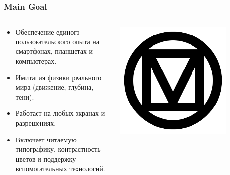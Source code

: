 \documentclass[12pt]{beamer}
\begin{document}
	\begin{frame}
		\frametitle{Main Goal}
        \begin{columns}
            \begin{column}{0.5\textwidth}
                \begin{itemize}
                    \item Обеспечение единого пользовательского опыта
                    на смартфонах, планшетах и компьютерах.
                    \item Имитация физики реального мира
                    (движение, глубина, тени).
                    \item Работает на любых экранах и разрешениях.
                    \item Включает читаемую типографику,
                    контрастность цветов и поддержку вспомогательных технологий. 
                \end{itemize}
            \end{column}
            \begin{column}{0.5\textwidth}
                \includegraphics[width=0.8\textwidth]{md.png}
            \end{column}
        \end{columns}

	\end{frame}
\end{document}
